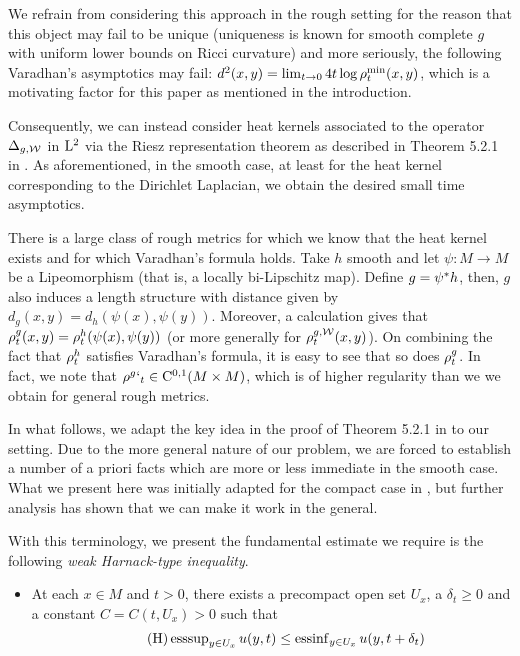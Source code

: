 \documentclass[a4paper, 12pt]{amsart}
\begin{document}
We refrain from considering this approach in the rough setting 
for the reason that this object may fail to be unique (uniqueness
is known for smooth complete $g$ with 
uniform lower bounds on Ricci curvature) and more seriously, the following
Varadhan's asymptotics may fail: 
$d^2(x,y) = \lim_{t \to 0} 4t \log \rho^{\min}_t(x,y)$,
which is a motivating factor for this paper as mentioned in the 
introduction.

Consequently, we can instead consider heat kernels
associated to the operator $\Delta_{g,\mathcal{W}}$ in ${\rm L}^{2}_{\rm {}}$
via the Riesz representation theorem as described in Theorem 
5.2.1 in \cite{Davies}. As aforementioned, in the smooth case,
at least for the heat kernel corresponding to the 
Dirichlet Laplacian, we obtain the desired small time
asymptotics. 

There is a large class of rough metrics
for which we know that the heat kernel exists
and for which Varadhan's formula holds. 
Take $h$ smooth and let $\psi:M \to M$
be a Lipeomorphism (that is, a locally bi-Lipschitz map).
Define $g = {\psi}^\ast h$, then, $g$ 
also induces a length structure with 
distance given by $d_g(x,y) = d_h(\psi(x), \psi(y))$.
Moreover, a calculation gives
that $\rho^{g}_t(x,y) = \rho^{h}_t(\psi(x), \psi(y))$
(or more generally for $\rho^{g,\mathcal{W}}_t(x,y)$). 
On combining the fact that $\rho^h_t$ satisfies
Varadhan's formula, it is easy to see that
so does $\rho^{g}_t$. In fact, we 
note that $\rho^g`_t \in {\rm C}^{0,1}_{\rm {}}(M \times M)$,
which is of higher regularity than we we
obtain for general rough metrics.

In what follows, we adapt the key idea in 
the proof of Theorem 5.2.1 in \cite{Davies}
to our setting. Due to the more general 
nature of our problem, we are forced to 
establish a number of a priori facts which 
are more or less immediate in the smooth case.
What we present here was initially adapted for the
compact case in \cite{BRough}, but further analysis
has shown that we can make it work in the general.

With this terminology, we present the fundamental estimate we
require is the following \emph{weak Harnack-type inequality}.
\begin{itemize}
\item[] At each $x \in M$ and $t > 0$, there exists a precompact
open set $U_x$, a $\delta_t \geq 0$ and a constant $C = C(t, U_x)  > 0$ such that
\begin{equation}
\tag{H}
\label{eq:Harnack}
\operatorname{esssup}_{y \in U_x} u(y,t) 
	\leq \operatorname{essinf}_{y \in U_x} u(y, t + \delta_t)
\end{equation}
\end{itemize}
\end{document}

